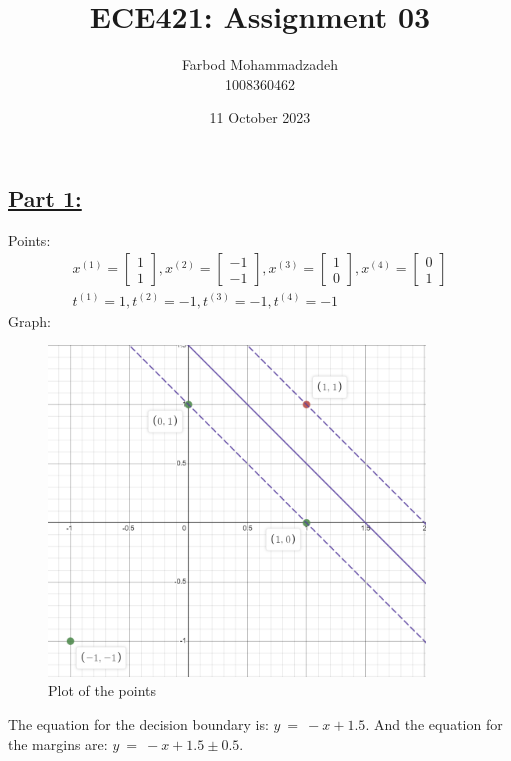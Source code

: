 \documentclass[20pt]{article}
\title{ECE421: Assignment 03}
\author{Farbod Mohammadzadeh\\
    1008360462}
\date{11 October 2023}
\begin{document}
\Large


\maketitle

\newpage

\section{}

\subsection*{\underline{Part 1:}}
Points:
\begin{eqnarray}
    x^{(1)} =  \begin{bmatrix}
        1 \\
        1
    \end{bmatrix},
    x^{(2)} = \begin{bmatrix}
        -1 \\
        -1
    \end{bmatrix},
    x^{(3)} = \begin{bmatrix}
        1 \\
        0
    \end{bmatrix},
    x^{(4)} = \begin{bmatrix}
        0 \\
        1
    \end{bmatrix} \\
    t^{(1)} = 1, t^{(2)} = -1, t^{(3)} = -1, t^{(4)} = -1
\end{eqnarray}
Graph:
\begin{figure}[h]
    \centering
    \includegraphics[width=10cm]{desmos-graph}
    \caption{Plot of the points}
    \label{fig:points}
\end{figure}
The equation for the decision boundary is: $y\ =\ -x+1.5$. And the equation for the margins are: $y\ =\ -x+1.5 \pm0.5$.
\end{document}
